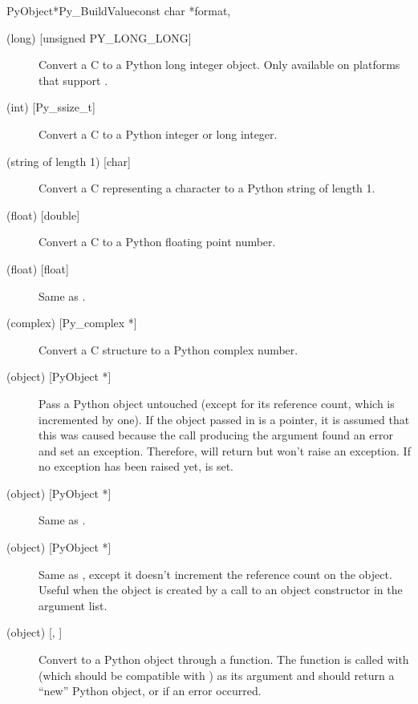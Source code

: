 \begin{cfuncdesc}{PyObject*}{Py_BuildValue}{const char *format,
                                            \moreargs}
\begin{description}
    \item[ (long) {[unsigned PY_LONG_LONG]}]
    Convert a C  to a Python long integer object.
    Only available on platforms that support .

    \item[ (int) {[Py_ssize_t]}]
    Convert a C  to a Python integer or long integer.

    \item[ (string of length 1) {[char]}]
    Convert a C  representing a character to a Python
    string of length 1.

    \item[ (float) {[double]}]
    Convert a C  to a Python floating point number.

    \item[ (float) {[float]}]
    Same as .

    \item[ (complex) {[Py_complex *]}]
    Convert a C  structure to a Python complex
    number.

    \item[ (object) {[PyObject *]}]
    Pass a Python object untouched (except for its reference count,
    which is incremented by one).  If the object passed in is a
    \NULL{} pointer, it is assumed that this was caused because the
    call producing the argument found an error and set an exception.
    Therefore,  will return \NULL{} but
    won't raise an exception.  If no exception has been raised yet,
     is set.

    \item[ (object) {[PyObject *]}]
    Same as .

    \item[ (object) {[PyObject *]}]
    Same as , except it doesn't increment the reference count
    on the object.  Useful when the object is created by a call to an
    object constructor in the argument list.

    \item[ (object) {[, ]}]
    Convert  to a Python object through a
     function.  The function is called with
     (which should be compatible with ) as
    its argument and should return a ``new'' Python object, or \NULL{}
    if an error occurred.


\end{description}
\end{cfuncdesc}
